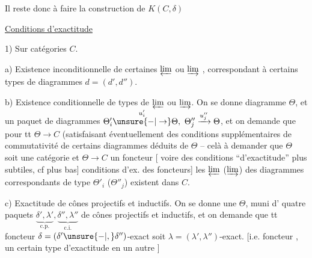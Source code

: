 

Il reste donc à faire la construction de $K(C,\delta)$


\uline{Conditions d'exactitude}\par 1) Sur catégories $C$.

a) Existence inconditionnelle de certaines $\varprojlim$ ou $\varinjlim$ , correspondant à certains types de diagrammes $d=(d',d'')$.



b) Existence conditionnelle de types de $\varprojlim$ ou $\varinjlim$. On se donne  diagramme $\Theta$, et  un paquet de diagrammes  $\Theta'_i\overset{u'_i}{\unsure{-|\to}}\Theta,\ \Theta''_j\xrightarrow{u''_j}\Theta$, et on demande que pour tt $\Theta\to C$ (satisfaisant éventuellement des conditions supplémentaires de commutativité de certains diagrammes déduits de $\Theta$ -- celà  à demander que $\Theta$ soit une catégorie et $\Theta\to C$ un foncteur [ voire des conditions ``d'exactitude'' plus subtiles, cf plus bas] conditions d'ex. des foncteurs] les $\varprojlim$ ($\varinjlim$) des diagrammes correspondants de type $\Theta'_i$ ($\Theta''_j$) existent dans $C$.


c) Exactitude de cônes projectifs et inductifs. On se donne une  $\Theta$, muni d' quatre paquets $\underbrace{\delta',\lambda'}_{\mathrm{c.p.}},\underbrace{\delta'',\lambda''}_{\mathrm{c.i.}}$ de cônes projectifs et inductifs, et on demande que tt foncteur $\delta=(\delta'\unsure{-|,}\delta'')$-exact soit $\lambda=(\lambda',\lambda'')$-exact. [i.e.   foncteur , un certain type d'exactitude en  un  autre ]


